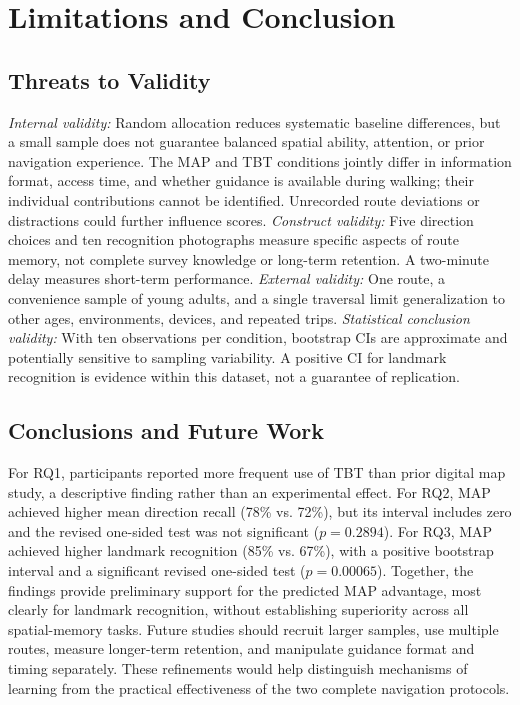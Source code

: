 \section{Limitations and Conclusion}\label{sec:conclusion}
\subsection{Threats to Validity}
\emph{Internal validity:} Random allocation reduces systematic baseline differences, but a small sample does not guarantee balanced spatial ability, attention, or prior navigation experience. The MAP and TBT conditions jointly differ in information format, access time, and whether guidance is available during walking; their individual contributions cannot be identified. Unrecorded route deviations or distractions could further influence scores. \emph{Construct validity:} Five direction choices and ten recognition photographs measure specific aspects of route memory, not complete survey knowledge or long-term retention. A two-minute delay measures short-term performance. \emph{External validity:} One route, a convenience sample of young adults, and a single traversal limit generalization to other ages, environments, devices, and repeated trips. \emph{Statistical conclusion validity:} With ten observations per condition, bootstrap CIs are approximate and potentially sensitive to sampling variability. A positive CI for landmark recognition is evidence within this dataset, not a guarantee of replication.

\subsection{Conclusions and Future Work}
For RQ1, participants reported more frequent use of TBT than prior digital map study, a descriptive finding rather than an experimental effect. For RQ2, MAP achieved higher mean direction recall (78\% vs. 72\%), but its interval includes zero and the revised one-sided test was not significant ($p=0.2894$). For RQ3, MAP achieved higher landmark recognition (85\% vs. 67\%), with a positive bootstrap interval and a significant revised one-sided test ($p=0.00065$). Together, the findings provide preliminary support for the predicted MAP advantage, most clearly for landmark recognition, without establishing superiority across all spatial-memory tasks. Future studies should recruit larger samples, use multiple routes, measure longer-term retention, and manipulate guidance format and timing separately. These refinements would help distinguish mechanisms of learning from the practical effectiveness of the two complete navigation protocols.
